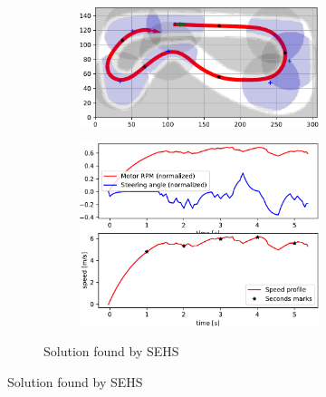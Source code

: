 \begin{figure}[!tbp]
	\vspace{0.75cm}
	
	\begin{subfigure}[t]{\textwidth}
		\begin{subfigure}[t]{0.45\textwidth}
			\includegraphics[width=\textwidth]{../img/experiments/porto-sehs-trajectory}
		\end{subfigure}
		\hfill
		\begin{subfigure}[t]{0.45\textwidth}
			\includegraphics[width=\textwidth]{../img/experiments/porto-sehs-actuators}
		\end{subfigure}
		\caption{Solution found by SEHS}
		\label{fig:solution_porto-sehs}
	\end{subfigure}

	\vspace{0.75cm}
	

\end{figure}
